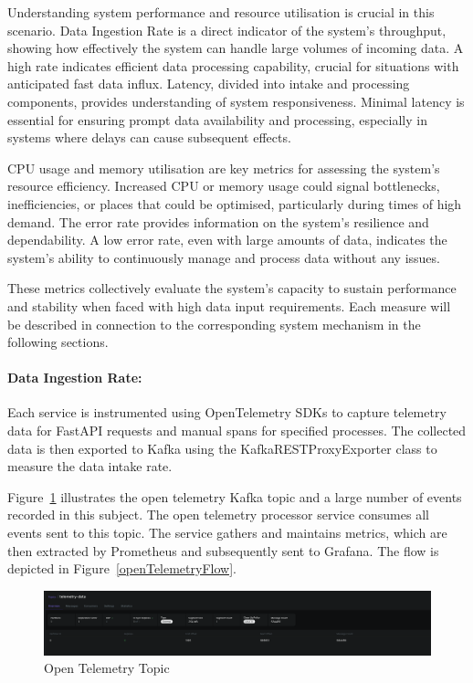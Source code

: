 \documentclass[journal]{IEEEtran}
\begin{document}
Understanding system performance and resource utilisation is crucial in this scenario. Data Ingestion Rate is a direct indicator of the system's throughput, showing how effectively the system can handle large volumes of incoming data. A high rate indicates efficient data processing capability, crucial for situations with anticipated fast data influx. Latency, divided into intake and processing components, provides understanding of system responsiveness. Minimal latency is essential for ensuring prompt data availability and processing, especially in systems where delays can cause subsequent effects. 

CPU usage and memory utilisation are key metrics for assessing the system's resource efficiency. Increased CPU or memory usage could signal bottlenecks, inefficiencies, or places that could be optimised, particularly during times of high demand. The error rate provides information on the system's resilience and dependability. A low error rate, even with large amounts of data, indicates the system's ability to continuously manage and process data without any issues. 

These metrics collectively evaluate the system's capacity to sustain performance and stability when faced with high data input requirements. Each measure will be described in connection to the corresponding system mechanism in the following sections.

\paragraph{Data Ingestion Rate:}
Each service is instrumented using OpenTelemetry SDKs to capture telemetry data for FastAPI requests and manual spans for specified processes. The collected data is then exported to Kafka using the KafkaRESTProxyExporter class to measure the data intake rate. 

Figure~\ref{openTelemetryTopic} illustrates the open telemetry Kafka topic and a large number of events recorded in this subject. The open telemetry processor service consumes all events sent to this topic. The service gathers and maintains metrics, which are then extracted by Prometheus and subsequently sent to Grafana. The flow is depicted in Figure~\ref{openTelemetryFlow}.


\begin{figure}[h]
  \centering
  \includegraphics[width=\textwidth]{images/kafka-open-telemetry-topic-screenshot.png}
  \caption{Open Telemetry Topic}
  \label{openTelemetryTopic}
\end{figure}
\end{document}
